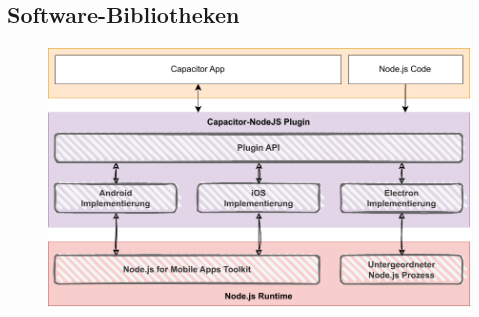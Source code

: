 \subsection{Software-Bibliotheken}

\begin{figure}[H]
    \centering
    \includegraphics[width=\textwidth]{assets/02_Capacitor-NodeJS/02_Zielsetzung+Libraries.drawio.pdf}
\end{figure}


\clearpage
